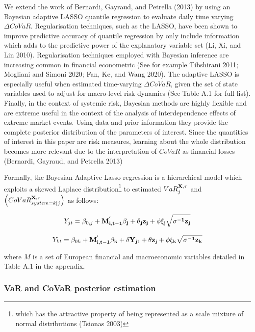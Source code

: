 \documentclass[
  10pt,
]{article}
\begin{document}
We extend the work of Bernardi, Gayraud, and Petrella (2013) by using an
Bayesian adaptive LASSO quantile regression to evaluate daily time
varying \(\Delta CoVaR\). Regularisation techniques, such as the LASSO,
have been shown to improve predictive accuracy of quantile regression by
only include information which adds to the predictive power of the
explanatory variable set (Li, Xi, and Lin 2010). Regularisation
techniques employed with Bayesian inference are increasing common in
financial econometric (See for example Tibshirani 2011; Mogliani and
Simoni 2020; Fan, Ke, and Wang 2020). The adaptive LASSO is especially
useful when estimated time-varying \(\Delta CoVaR\), given the set of
state variables used to adjust for macro-level risk dynamics (See Table
A.1 for full list). Finally, in the context of systemic risk, Bayesian
methods are highly flexible and are extreme useful in the context of the
analysis of interdependence effects of extreme market events. Using data
and prior information they provide the complete posterior distribution
of the parameters of interest. Since the quantities of interest in this
paper are risk measures, learning about the whole distribution becomes
more relevant due to the interpretation of \(CoVaR\) as financial losses
(Bernardi, Gayraud, and Petrella 2013)

Formally, the Bayesian Adaptive Lasso regression is a hierarchical model
which exploits a skewed Laplace distribution\footnote{which has the
  attractive property of being represented as a scale mixture of normal
  distributions (Tsionas 2003)} to estimated \(VaR^{\bf{X},\tau}_j\) and
\(\left( CoVaR_{system=k|j}^{\bf{X},\tau} \right)\) as follows:

\begin{equation}\label{eq:eq4}
Y_{jt}=\beta_{0,j}+\bf{M^{'}_{i,t-1}} \bf{\beta_j} +\theta_j z_j+\phi \xi_j \sqrt{\sigma^{-1}z_j} 
\end{equation}

\begin{equation}\label{eq:eq5}
Y_{kt}=\beta_{0k}+\bf{M^{'}_{i,t-1}} \bf{\beta_k} +\delta Y_{jt}+\theta z_j+\phi\xi_k\sqrt{\sigma^{-1}z_k}
\end{equation}

where \(M\) is a set of European financial and macroeconomic variables
detailed in Table A.1 in the appendix.

\hypertarget{var-and-covar-posterior-estimation}{%
\subsubsection{VaR and CoVaR posterior
estimation}\label{var-and-covar-posterior-estimation}}
\end{document}
